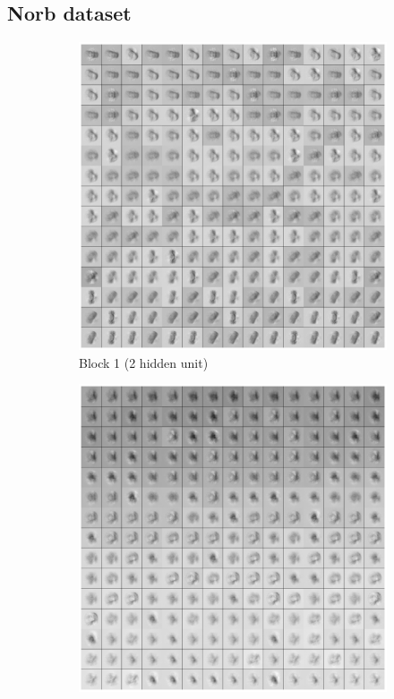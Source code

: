 \subsection{Norb dataset}

\begin{figure}
\centering
    \begin{subfigure}[b]{0.5\textwidth}
    \includegraphics[width=\textwidth]{images/norbNWblock1sample.eps}
    \vspace{-2\baselineskip}
    \caption{Block 1 (2 hidden unit)}
    \end{subfigure}
	\begin{subfigure}[b]{0.5\textwidth}
    \includegraphics[width=\textwidth]{images/norbNWblock2sample.eps}

\end{subfigure}
\end{figure}
